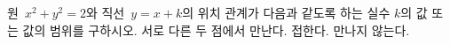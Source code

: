 원~$x^2+y^2=2$와 직선~$y=x+k$의 위치 관계가 다음과 같도록 하는 실수 $k$의 값 또는 값의 범위를 구하시오.
 서로 다른 두 점에서 만난다.
 접한다.
 만나지 않는다.
